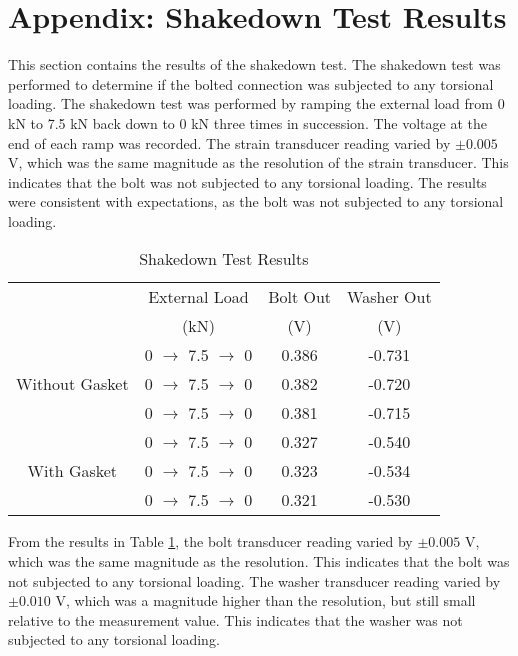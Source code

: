 \section{Appendix: Shakedown Test Results}
\label{app:shakedown_test}
This section contains the results of the shakedown test. The shakedown test was performed to determine if the bolted connection was subjected to any torsional loading. The shakedown test was performed by ramping the external load from 0 kN to 7.5 kN back down to 0 kN three times in succession. The voltage at the end of each ramp was recorded. The strain transducer reading varied by $\pm 0.005$ V, which was the same magnitude as the resolution of the strain transducer. This indicates that the bolt was not subjected to any torsional loading. The results were consistent with expectations, as the bolt was not subjected to any torsional loading. 


\begin{table}[h]
    \centering
    \caption{Shakedown Test Results}
    \label{tab:shakedown_test}
    \begin{tabular}{cccc}
    \toprule
    & External Load	& Bolt Out & Washer Out \\
    & (kN)	& (V) & (V) \\
    \midrule
    \multirow{3}{*}{Without Gasket} & 0 $\rightarrow$ 7.5 $\rightarrow$ 0 & 0.386 & -0.731 \\
    & 0 $\rightarrow$ 7.5 $\rightarrow$ 0 & 0.382 & -0.720 \\
    & 0 $\rightarrow$ 7.5 $\rightarrow$ 0 & 0.381 & -0.715 \\
    \midrule
    \multirow{3}{*}{With Gasket} & 0 $\rightarrow$ 7.5 $\rightarrow$ 0 & 0.327 & -0.540 \\
    & 0 $\rightarrow$ 7.5 $\rightarrow$ 0 & 0.323 & -0.534 \\
    & 0 $\rightarrow$ 7.5 $\rightarrow$ 0 & 0.321 & -0.530 \\
    \bottomrule
    \end{tabular}
\end{table}

From the results in Table \ref{tab:shakedown_test}, the bolt transducer reading varied by $\pm 0.005$ V, which was the same magnitude as the resolution. This indicates that the bolt was not subjected to any torsional loading. The washer transducer reading varied by $\pm 0.010$ V, which was a magnitude higher than the resolution, but still small relative to the measurement value. This indicates that the washer was not subjected to any torsional loading.